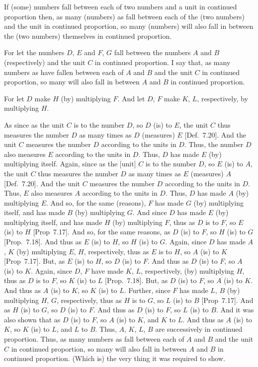 If (some) numbers fall between each of two numbers and a unit in continued proportion then, as many (numbers)
as fall between each of the (two numbers) and the unit in continued proportion, so many (numbers)  will also fall in between the (two numbers) themselves in continued proportion.

For let the numbers $D$, $E$ and $F$, $G$ fall between the numbers $A$ and $B$ (respectively) and the unit $C$ in continued proportion. I say that,
as many numbers as have fallen between each of $A$ and $B$ and the unit $C$ in continued proportion,
so many will also fall in between $A$ and $B$ in continued proportion.

\epsfysize=1.8in
\centerline{}

For let $D$ make $H$ (by) multiplying $F$. And let  $D$, $F$
make $K$, $L$, respectively, by multiplying $H$.

As since as the unit $C$  is to the number $D$, so $D$ (is) to $E$, the unit
$C$ thus measures the number $D$ as many times as $D$ (measures) $E$
[Def.~7.20]. And the unit $C$ measures the
number $D$ according to the units in $D$. Thus, the number $D$
also measures $E$ according to the units in $D$. Thus, $D$ has made $E$
(by) multiplying itself. Again, since as the [unit] $C$ is to
the number $D$, so $E$ (is) to $A$, the unit $C$ thus measures the number
$D$ as many times as $E$ (measures) $A$ [Def.~7.20].
  And the unit $C$ measures the number $D$ according to the units in $D$.
  Thus, $E$ also measures $A$ according to the units  in $D$. Thus, $D$
  has made $A$ (by) multiplying $E$. And so, for the same (reasons), 
  $F$ has made $G$ (by) multiplying itself, and has made $B$ (by)
  multiplying $G$. And since $D$ has made $E$ (by) multiplying itself,
  and has made $H$ (by) multiplying $F$, thus as $D$ is to $F$, so
  $E$ (is) to $H$ [Prop~7.17]. And so, for the
  same reasons, as $D$ (is) to $F$, so $H$ (is) to $G$ [Prop.~7.18].  And thus as $E$ (is) to $H$, so $H$
  (is) to $G$. Again, since $D$ has made  $A$, $K$ (by)
  multiplying $E$, $H$, respectively, thus as $E$ is to $H$, so $A$ (is)
  to $K$ [Prop~7.17]. But, as $E$ (is) to $H$,
  so $D$ (is) to $F$. And thus as $D$ (is) to $F$, so $A$ (is) to $K$.
  Again, since  $D$, $F$ have made  $K$, $L$, respectively, (by) multiplying $H$, thus as $D$ is to $F$, so $K$ (is) to $L$ [Prop.~7.18]. But, as $D$ (is) to $F$, so $A$ (is)
  to $K$.  And thus as $A$ (is) to $K$, so $K$ (is) to $L$.
   Further, since $F$ has made  $L$, $B$ (by) multiplying
   $H$, $G$, respectively, thus as $H$ is to $G$, so $L$ (is) to $B$  [Prop~7.17]. And as $H$ (is) to $G$, so $D$ (is) to $F$. And thus as $D$ 
  (is) to $F$, so $L$ (is) to $B$. And it was also
  shown that as $D$ (is) to $F$, so $A$ (is) to $K$, and $K$ to $L$.
  And thus as $A$ (is) to $K$, so $K$ (is) to $L$, and $L$ to $B$.
  Thus, $A$, $K$, $L$, $B$ are  successively in continued proportion.
  Thus, as many numbers as fall between each of $A$ and $B$ and the unit $C$ in continued proportion, so many will also fall in between $A$ and $B$
  in continued proportion. (Which is) the very thing it was required to show.

